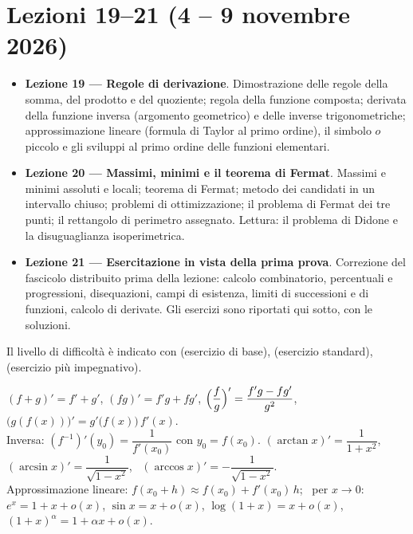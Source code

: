 \chapter{Lezioni 19--21 (4 -- 9 novembre 2026)}

\begin{vuoto}{}
\begin{itemize}
\item[\bul] \textbf{Lezione 19 --- Regole di derivazione}. Dimostrazione delle regole della somma, del prodotto e del quoziente; regola della funzione composta; derivata della funzione inversa (argomento geometrico) e delle inverse trigonometriche; approssimazione lineare (formula di Taylor al primo ordine), il simbolo $o$ piccolo e gli sviluppi al primo ordine delle funzioni elementari.
\item[\bul] \textbf{Lezione 20 --- Massimi, minimi e il teorema di Fermat}. Massimi e minimi assoluti e locali; teorema di Fermat; metodo dei candidati in un intervallo chiuso; problemi di ottimizzazione; il problema di Fermat dei tre punti; il rettangolo di perimetro assegnato. Lettura: il problema di Didone e la disuguaglianza isoperimetrica.
\item[\bul] \textbf{Lezione 21 --- Esercitazione in vista della prima prova}. Correzione del fascicolo distribuito prima della lezione: calcolo combinatorio, percentuali e progressioni, disequazioni, campi di esistenza, limiti di successioni e di funzioni, calcolo di derivate. Gli esercizi sono riportati qui sotto, con le soluzioni.
\end{itemize}
\end{vuoto}

Il livello di difficoltà è indicato con  (esercizio di base),  (esercizio standard),  (esercizio più impegnativo).

\begin{vuoto}{}
$(f+g)'=f'+g'$, \quad $(fg)'=f'g+fg'$, \quad $\Bigl(\dfrac fg\Bigr)'=\dfrac{f'g-fg'}{g^2}$, \quad $\bigl(g(f(x))\bigr)'=g'\bigl(f(x)\bigr)\,f'(x)$.\\[2pt]
Inversa: $(f^{-1})'(y_0)=\dfrac1{f'(x_0)}$ con $y_0=f(x_0)$. \quad $(\arctan x)'=\dfrac1{1+x^2}$, \ $(\arcsin x)'=\dfrac1{\sqrt{1-x^2}}$, \ $(\arccos x)'=-\dfrac1{\sqrt{1-x^2}}$.\\[2pt]
Approssimazione lineare: $f(x_0+h)\approx f(x_0)+f'(x_0)\,h$; \ per $x\to0$: $e^x=1+x+o(x)$, $\sin x=x+o(x)$, $\log(1+x)=x+o(x)$, $(1+x)^\alpha=1+\alpha x+o(x)$.
\end{vuoto}

